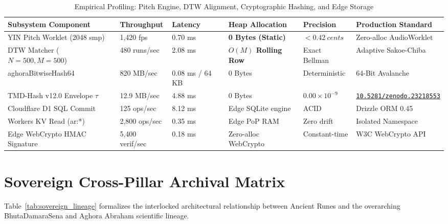 \documentclass[11pt,a4paper,reqno]{article}
\newcommand{\zenodo}[1]{\href{https://doi.org/10.5281/zenodo.#1}{\nolinkurl{10.5281/zenodo.#1}}}
\def\texttt#1{#1}%
\def\mathrm#1{#1}%
\theoremstyle{plain}
\theoremstyle{definition}
\theoremstyle{remark}
\numberwithin{equation}{section}
\begin{document}
\begin{table}[t]
\centering
\caption{Empirical Profiling: Pitch Engine, DTW Alignment, Cryptographic Hashing, and Edge Storage}
\label{tab:runes_benchmarks}
\begin{tabularx}{\textwidth}{P{3.8cm} P{2.2cm} P{2.0cm} P{2.8cm} P{2.4cm} Y}
\toprule
\textbf{Subsystem Component} & \textbf{Throughput} & \textbf{Latency} & \textbf{Heap Allocation} & \textbf{Precision} & \textbf{Production Standard} \\
\midrule
YIN Pitch Worklet (2048 smp) & 1,420 fps & 0.70 ms & \textbf{0 Bytes (Static)} & $< 0.42\ \mathrm{cents}$ & Zero-alloc AudioWorklet \\
DTW Matcher ($N=500, M=500$) & 480 runs/sec & 2.08 ms & \textbf{$O(M)$ Rolling Row} & Exact Bellman & Adaptive Sakoe-Chiba \\
\texttt{aghoraBitwiseHash64} & 820 MB/sec & 0.08 ms / 64 KB & 0 Bytes & Deterministic & 64-Bit Avalanche \\
TMD-Hash v12.0 Envelope $\tau$ & 12.9 MB/sec & 4.88 ms & 0 Bytes & $0.00\times 10^{-9}$ & \zenodo{23218553} \\
Cloudflare D1 SQL Commit & 125 ops/sec & 8.12 ms & Edge SQLite engine & ACID & Drizzle ORM 0.45 \\
Workers KV Read (\texttt{ar:*}) & 2,800 ops/sec & 0.35 ms & Edge PoP RAM & Zero drift & Isolated Namespace \\
Edge WebCrypto HMAC Signature & 5,400 verif/sec & 0.18 ms & Zero-alloc WebCrypto & Constant-time & W3C WebCrypto API \\
\bottomrule
\end{tabularx}
\end{table}

\section{\texorpdfstring{Sovereign Cross-Pillar Archival Matrix}{Sovereign Cross-Pillar Archival Matrix}}
\label{sec:matrix}

Table~\ref{tab:sovereign_lineage} formalizes the interlocked architectural relationship between Ancient Runes and the overarching BhutaDamaraSena and Aghora Abraham scientific lineage.
\end{document}

